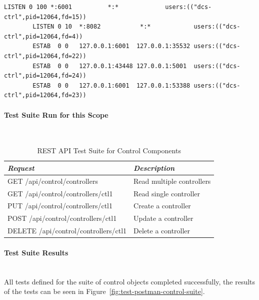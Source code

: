       \begin{lstlisting}[caption={Socket Status During Feedback Control Tests},
                         label={lst:test-rest-control-ss}]
        LISTEN 0 100 *:6001          *:*             users:(("dcs-ctrl",pid=12064,fd=15))
        LISTEN 0 10  *:8082           *:*            users:(("dcs-ctrl",pid=12064,fd=4))
        ESTAB  0 0   127.0.0.1:6001  127.0.0.1:35532 users:(("dcs-ctrl",pid=12064,fd=22))
        ESTAB  0 0   127.0.0.1:43448 127.0.0.1:5001  users:(("dcs-ctrl",pid=12064,fd=24))
        ESTAB  0 0   127.0.0.1:6001  127.0.0.1:53388 users:(("dcs-ctrl",pid=12064,fd=23))
      \end{lstlisting}

      \paragraph{Test Suite Run for this Scope}\mbox{}\\

      \begin{table}[H]
        \centering
        \begin{tabular}{p{3in} p{3in}}
          \toprule
          \emph{Request} & \emph{Description} \\ [0.5ex]
          \midrule
             GET /api/control/controllers       & Read multiple controllers \\
             GET /api/control/controllers/ctl1  &   Read single controller \\
             PUT /api/control/controllers/ctl1  &      Create a controller \\
            POST /api/control/controllers/ctl1  &      Update a controller \\
          DELETE /api/control/controllers/ctl1  &      Delete a controller \\
          \bottomrule
        \end{tabular}
        \caption{REST API Test Suite for Control Components}\label{tab:test-rest-control-suite}
      \end{table}

      \paragraph{Test Suite Results}\mbox{}\\

        All tests defined for the suite of control objects completed
        successfully, the results of the tests can be seen in
        Figure~\ref{fig:test-postman-control-suite}.


